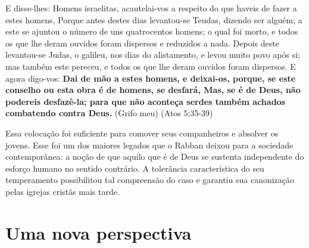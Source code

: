 \documentclass[12pt, oneside,twocolumns, a4paper, brazil]{abntex2}
\begin{document}
\begin{citacao}

E disse-lhes: Homens israelitas, acautelai-vos a respeito do que haveis de fazer a estes homens,
Porque antes destes dias levantou-se Teudas, dizendo ser alguém; a este se ajuntou o número de uns quatrocentos homens; o qual foi morto, e todos os que lhe deram ouvidos foram dispersos e reduzidos a nada.
Depois deste levantou-se Judas, o galileu, nos dias do alistamento, e levou muito povo após si; mas também este pereceu, e todos os que lhe deram ouvidos foram dispersos.
E agora digo-vos: \textbf{Dai de mão a estes homens, e deixai-os, porque, se este conselho ou esta obra é de homens, se desfará,
Mas, se é de Deus, não podereis desfazê-la; para que não aconteça serdes também achados combatendo contra Deus.} (Grifo meu) (Atos 5:35-39)

\end{citacao}

Essa colocação foi suficiente para comover seus companheiros e absolver os jovens. Esse foi um dos maiores legados que o Rabban deixou para a sociedade contemporânea: a noção de que aquilo que é de Deus se sustenta independente do esforço humano no sentido contrário. A tolerância característica do seu temperamento possibilitou tal compreensão do caso e garantiu sua canonização pelas igrejas cristãs mais tarde. \par

\section*{Uma nova perspectiva}
\end{document}
